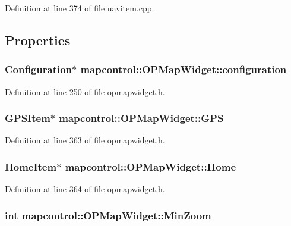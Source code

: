 \-Definition at line 374 of file uavitem.\-cpp.



\subsection{\-Properties}
\hypertarget{group___o_p_map_widget_gaa79e123990d6d7b2f1c45e5c2a56313d}{
\subsubsection[{configuration}]{\setlength{\rightskip}{0pt plus 5cm}\-Configuration$\ast$ {\bf mapcontrol\-::\-O\-P\-Map\-Widget\-::configuration}}}\label{group___o_p_map_widget_gaa79e123990d6d7b2f1c45e5c2a56313d}


\-Definition at line 250 of file opmapwidget.\-h.

\hypertarget{group___o_p_map_widget_ga83798c623babeffb173d483ad1c84ccc}{
\subsubsection[{\-G\-P\-S}]{\setlength{\rightskip}{0pt plus 5cm}\-G\-P\-S\-Item$\ast$ {\bf mapcontrol\-::\-O\-P\-Map\-Widget\-::\-G\-P\-S}}}\label{group___o_p_map_widget_ga83798c623babeffb173d483ad1c84ccc}


\-Definition at line 363 of file opmapwidget.\-h.

\hypertarget{group___o_p_map_widget_ga3c39e182c87b25990664fbe7dd0a9eff}{
\subsubsection[{\-Home}]{\setlength{\rightskip}{0pt plus 5cm}\-Home\-Item$\ast$ {\bf mapcontrol\-::\-O\-P\-Map\-Widget\-::\-Home}}}\label{group___o_p_map_widget_ga3c39e182c87b25990664fbe7dd0a9eff}


\-Definition at line 364 of file opmapwidget.\-h.

\hypertarget{group___o_p_map_widget_gac91f92751a3ac3a5a10a6592d4213d42}{
\subsubsection[{\-Min\-Zoom}]{\setlength{\rightskip}{0pt plus 5cm}int {\bf mapcontrol\-::\-O\-P\-Map\-Widget\-::\-Min\-Zoom}}}\label{group___o_p_map_widget_gac91f92751a3ac3a5a10a6592d4213d42}


